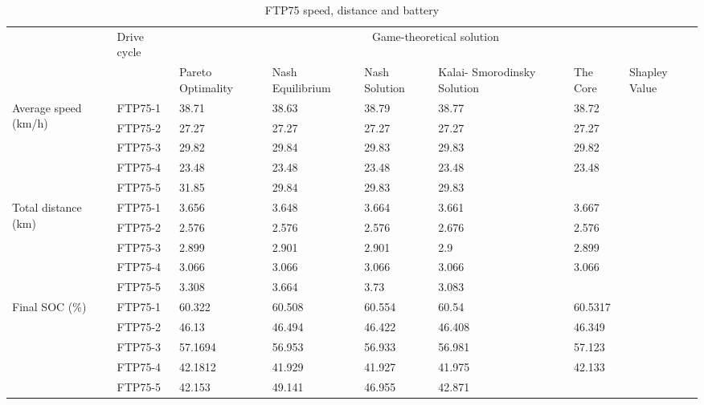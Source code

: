 \begin{table}[h]
\centering
\begin{tabular}{ |p{1.5cm}|p{1.5cm}|p{1.3cm}|p{1.3cm}|p{1.3cm}|p{1.3cm}|p{1.3cm}|p{1.3cm}|} 
 \hline
  \cline{3-8}
   & Drive cycle & \multicolumn{6}{|c|}{Game-theoretical solution} \\
   \cline{3-8}
   & & Pareto Optimality & Nash Equilibrium & Nash Solution & Kalai- Smorodinsky Solution & The Core & Shapley Value\\
 \hline\hline
 \multirow{5}{*}{\parbox{1.5cm}{Average speed (km/h)}}
 & FTP75-1 & 38.71 & 38.63 & 38.79 & 38.77 & 38.72 & \\
 & FTP75-2 & 27.27 & 27.27 & 27.27 & 27.27 & 27.27 & \\ 
 & FTP75-3 & 29.82 & 29.84 & 29.83 & 29.83 & 29.82 & \\ 
 & FTP75-4 & 23.48 & 23.48 & 23.48 & 23.48 & 23.48 & \\ 
 & FTP75-5 & 31.85 & 29.84 & 29.83 & 29.83 & & \\ 
 \hline 
 \multirow{5}{*}{\parbox{1.5cm}{Total distance (km)}}
 & FTP75-1 & 3.656 & 3.648 & 3.664 & 3.661 & 3.667 & \\ 
 & FTP75-2 & 2.576 & 2.576 & 2.576 & 2.676 & 2.576 & \\ 
 & FTP75-3 & 2.899 & 2.901 & 2.901 & 2.9 & 2.899 & \\ 
 & FTP75-4 & 3.066 & 3.066 & 3.066 & 3.066 & 3.066 & \\ 
 & FTP75-5 & 3.308 & 3.664 & 3.73 & 3.083 & & \\ 
 \hline 
 \multirow{5}{*}{\parbox{1.5cm}{Final SOC (\%)}}
 & FTP75-1 & 60.322 & 60.508 & 60.554 & 60.54 & 60.5317 & \\ 
 & FTP75-2 & 46.13 & 46.494 & 46.422 & 46.408 & 46.349 & \\ 
 & FTP75-3 & 57.1694 & 56.953 & 56.933 & 56.981 & 57.123 & \\ 
 & FTP75-4 & 42.1812 & 41.929 & 41.927 & 41.975 & 42.133 & \\ 
 & FTP75-5 & 42.153 & 49.141 & 46.955 & 42.871 & & \\ 
 \hline

 \hline
\end{tabular}
\caption{FTP75 speed, distance and battery}
\label{tab:soc}
\end{table}
